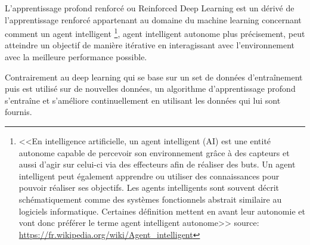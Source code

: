 L'apprentissage profond renforcé ou Reinforced Deep Learning est un dérivé de l'apprentissage
renforcé appartenant au domaine du machine learning concernant comment un agent intelligent
\footnote{<<En intelligence artificielle, un agent intelligent (AI) est une entité autonome capable de
percevoir son environnement grâce à des capteurs et aussi d'agir sur celui-ci via des effecteurs
afin de réaliser des buts.
Un agent intelligent peut également apprendre ou utiliser des connaissances pour pouvoir réaliser
 ses objectifs. Les agents intelligents sont souvent décrit schématiquement comme des systèmes fonctionnels abstrait
similaire au logiciels informatique. Certaines définition mettent en avant leur autonomie
et vont donc préférer le terme agent intelligent autonome>> \newline
source: \url{https://fr.wikipedia.org/wiki/Agent_intelligent} \newline},
agent intelligent autonome plus précisement, peut atteindre un objectif de manière itérative en
interagissant avec l'environnement avec la meilleure performance possible. \newline

Contrairement au deep learning qui se base sur un set de données d'entraînement
puis est utilisé sur de nouvelles données, un algorithme d'apprentissage profond
s'entraîne et s'améliore continuellement en utilisant les données qui lui sont
fournis. \newline

